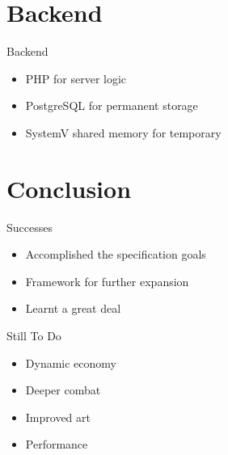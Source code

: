 \section{Backend}
\begin{frame}{Backend}
  \begin{itemize}
    \item PHP for server logic
    \item PostgreSQL for permanent storage
    \item SystemV shared memory for temporary
  \end{itemize}
\end{frame}

\section{Conclusion}
\begin{frame}{Successes}
  \begin{itemize}
    \item Accomplished the specification goals
    \item Framework for further expansion
    \item Learnt a great deal
  \end{itemize}
\end{frame}

\begin{frame}{Still To Do}
  \begin{itemize}
    \item Dynamic economy
    \item Deeper combat
    \item Improved art
    \item Performance
  \end{itemize}
\end{frame}



